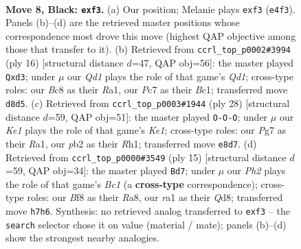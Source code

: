\documentclass[11pt]{article}
\begin{document}
\begin{figure}[p]\centering
\begin{subfigure}{0.46\textwidth}\centering
\resizebox{\linewidth}{!}{%
\newchessgame
\chessboard[
  setfen={r1bqkb1r/ppp2ppp/2n5/3P4/4p3/5N2/PPP2PPP/RNBQK2R b KQkq - 0 8},
  showmover=false,
  pgfstyle=straightmove, color=movearrow, markmove={e4-f3}
]}
\caption{}
\end{subfigure}\hfill
\begin{subfigure}{0.46\textwidth}\centering
\resizebox{\linewidth}{!}{%
\newchessgame
\chessboard[
  setfen={rnbqk2r/pp3ppp/2p2n2/2p5/2P5/2Np2P1/PP2PP1P/R1BQKB1R w KQkq - 0 9},
  showmover=false,
  pgfstyle=straightmove, color=movearrow, markmove={d1-d3}
]}
\caption{}
\end{subfigure}
\\[4pt]
\begin{subfigure}{0.46\textwidth}\centering
\resizebox{\linewidth}{!}{%
\newchessgame
\chessboard[
  setfen={rn1qk2r/1p2bppp/p4n2/5P2/3p1B2/P1N5/1PP1Q1PP/R3KB1R w KQkq - 0 15},
  showmover=false,
  pgfstyle=straightmove, color=movearrow, markmove={e1-c1}
]}
\caption{}
\end{subfigure}\hfill
\begin{subfigure}{0.46\textwidth}\centering
\resizebox{\linewidth}{!}{%
\newchessgame
\chessboard[
  setfen={r1bqk2r/ppp2ppp/2nb4/1B2p3/3P4/2P2N2/P1P2PPP/R1BQK2R b KQkq - 0 8},
  showmover=false,
  pgfstyle=straightmove, color=movearrow, markmove={c8-d7}
]}
\caption{}
\end{subfigure}
\caption{\textbf{Move 8, Black: \texttt{exf3}.} (a) Our position; Melanie plays \texttt{exf3} (\texttt{e4f3}). Panels (b)--(d) are the retrieved master positions whose correspondence most drove this move (highest QAP objective among those that transfer to it). (b) Retrieved from \texttt{ccrl\_top\_p0002\#3994} (ply 16) [structural distance $d$=47, QAP obj=56]: the master played \texttt{Qxd3}; under $\mu$ our \emph{Qd1} plays the role of that game's \emph{Qd1}; cross-type roles: our \emph{B}c8 as their \emph{R}a1, our \emph{P}c7 as their \emph{B}c1; transferred move \texttt{d8d5}. (c) Retrieved from \texttt{ccrl\_top\_p0003\#1944} (ply 28) [structural distance $d$=59, QAP obj=51]: the master played \texttt{O-O-O}; under $\mu$ our \emph{Ke1} plays the role of that game's \emph{Ke1}; cross-type roles: our \emph{P}g7 as their \emph{R}a1, our \emph{p}b2 as their \emph{R}h1; transferred move \texttt{e8d7}. (d) Retrieved from \texttt{ccrl\_top\_p0000\#3549} (ply 15) [structural distance $d$=59, QAP obj=34]: the master played \texttt{Bd7}; under $\mu$ our \emph{Ph2} plays the role of that game's \emph{Bc1} (a \textbf{cross-type} correspondence); cross-type roles: our \emph{B}f8 as their \emph{R}a8, our \emph{r}a1 as their \emph{Q}d8; transferred move \texttt{h7h6}. Synthesis: no retrieved analog transferred to \texttt{exf3} -- the \texttt{search} selector chose it on value (material / mate); panels (b)--(d) show the strongest nearby analogies.}
\label{fig:thought-m15}
\end{figure}
\end{document}
